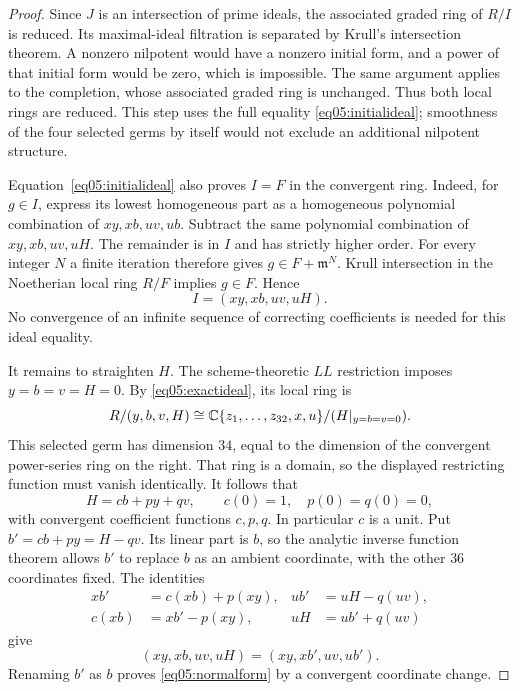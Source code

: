 \begin{proof}
Since $J$ is an intersection of prime ideals, the associated graded
ring of $R/I$ is reduced.  Its maximal-ideal filtration is separated by
Krull's intersection theorem.  A nonzero nilpotent would have a nonzero
initial form, and a power of that initial form would be zero, which is
impossible.  The same argument applies to the completion, whose
associated graded ring is unchanged.  Thus both local rings are
reduced.  This step uses the full equality \eqref{eq05:initialideal};
smoothness of the four selected germs by itself would not exclude an
additional nilpotent structure.

Equation~\eqref{eq05:initialideal} also proves $I=F$ in the convergent
ring.  Indeed, for $g\in I$, express its lowest homogeneous part as a
homogeneous polynomial combination of $xy,xb,uv,ub$.  Subtract the same
polynomial combination of $xy,xb,uv,uH$.  The remainder is in $I$ and
has strictly higher order.  For every integer $N$ a finite iteration
therefore gives $g\in F+\mathfrak m^N$.  Krull intersection in the
Noetherian local ring $R/F$ implies $g\in F$.  Hence
\begin{equation}\label{eq05:exactideal}
 I=(xy,xb,uv,uH).
\end{equation}
No convergence of an infinite sequence of correcting coefficients is
needed for this ideal equality.

It remains to straighten $H$.  The scheme-theoretic $LL$ restriction
imposes $y=b=v=H=0$.  By \eqref{eq05:exactideal}, its local ring is
\[
 R/(y,b,v,H)\cong
 \mathbb{C}\{z_1,\ldots,z_{32},x,u\}/(H|_{y=b=v=0}).
\]
This selected germ has dimension $34$, equal to the dimension of the
convergent power-series ring on the right.  That ring is a domain, so
the displayed restricting function must vanish identically.  It follows
that
\begin{equation}\label{eq05:Hdecomposition}
 H=cb+py+qv,\qquad c(0)=1,\quad p(0)=q(0)=0,
\end{equation}
with convergent coefficient functions $c,p,q$.  In particular $c$ is a
unit.  Put $b'=cb+py=H-qv$.  Its linear part is $b$, so the analytic
inverse function theorem allows $b'$ to replace $b$ as an ambient
coordinate, with the other $36$ coordinates fixed.  The identities
\[
\begin{aligned}
 xb'&=c(xb)+p(xy),& ub'&=uH-q(uv),\\
 c(xb)&=xb'-p(xy),& uH&=ub'+q(uv)
\end{aligned}
\]
give
\[
 (xy,xb,uv,uH)=(xy,xb',uv,ub').
\]
Renaming $b'$ as $b$ proves \eqref{eq05:normalform} by a convergent
coordinate change.


\end{proof}
